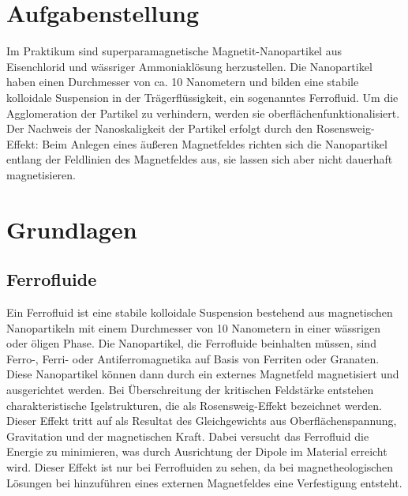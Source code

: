 \documentclass[a4paper]{TUBAFprotokoll}
\begin{document}
		\maketitle
		\tableofcontents
		\newpage
		\section{Aufgabenstellung}
		Im Praktikum sind superparamagnetische Magnetit-Nanopartikel aus Eisenchlorid und wässriger Ammoniaklösung herzustellen. Die Nanopartikel haben einen Durchmesser von ca. 10 Nanometern und bilden eine stabile kolloidale Suspension in der Trägerflüssigkeit, ein sogenanntes Ferrofluid. Um die Agglomeration der Partikel zu verhindern, werden sie oberflächenfunktionalisiert. Der Nachweis der Nanoskaligkeit der Partikel erfolgt durch den Rosensweig-Effekt: Beim Anlegen eines äußeren Magnetfeldes richten sich die Nanopartikel entlang der Feldlinien des Magnetfeldes aus, sie lassen sich aber nicht dauerhaft magnetisieren.
		
		\section{Grundlagen}
		\subsection{Ferrofluide}
		Ein Ferrofluid ist eine stabile kolloidale Suspension bestehend aus magnetischen Nanopartikeln mit einem Durchmesser von 10 Nanometern in einer wässrigen oder öligen Phase. Die Nanopartikel, die Ferrofluide beinhalten müssen, sind Ferro-, Ferri- oder Antiferromagnetika auf Basis von Ferriten oder Granaten. Diese Nanopartikel können dann durch ein externes Magnetfeld magnetisiert und ausgerichtet werden. Bei Überschreitung der kritischen Feldstärke entstehen charakteristische Igelstrukturen, die als Rosensweig-Effekt bezeichnet werden. Dieser Effekt tritt auf als Resultat des Gleichgewichts aus Oberflächenspannung, Gravitation und der magnetischen Kraft. Dabei versucht das Ferrofluid die Energie zu minimieren, was durch Ausrichtung der Dipole im Material erreicht wird. Dieser Effekt ist nur bei Ferrofluiden zu sehen, da bei magnetheologischen Lösungen bei hinzuführen eines externen Magnetfeldes eine Verfestigung entsteht. 
		
\end{document}
